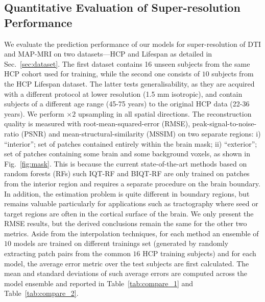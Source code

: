 \subsection{Quantitative Evaluation of Super-resolution Performance}
We evaluate the prediction performance of our models for super-resolution of DTI and MAP-MRI on two datasets---HCP and Lifespan as detailed in Sec.~\ref{sec:dataset}. The first dataset contains 16 unseen subjects from the same HCP cohort used for training, while the second one consists of $10$ subjects from the HCP Lifespan dataset. The latter tests generalisability, as they are acquired with a different protocol at lower resolution (1.5 mm isotropic), and contain subjects of a different age range (45-75 years) to the original HCP data (22-36 years). We perform $\times 2$ upsampling in all spatial directions. The reconstruction quality is measured with root-mean-squared-error (RMSE), peak-signal-to-noise-ratio (PSNR) and mean-structural-similarity (MSSIM) \cite{wang2004image} on two separate regions:  i) ``interior''; set of patches contained entirely within the brain mask; ii) ``exterior''; set of patches containing some brain and some background voxels, as shown in Fig.~\ref{fig:mask}. This is because the current state-of-the-art methods based on random forests (RFs) such IQT-RF \cite{alexander2017image} and BIQT-RF \cite{tanno2016bayesian} are only trained on patches from the interior region and requires a separate procedure on the brain boundary. In addition, the estimation problem is quite different in boundary regions, but remains valuable particularly for applications such as tractography where seed or target regions are often in the cortical surface of the brain. We only present the RMSE results, but the derived conclusions remain the same for the other two metrics. Aside from the interpolation techniques, for each method an ensemble of $10$ models are trained on different trainings set (generated by randomly extracting patch pairs from the common $16$ HCP training subjects) and for each model, the average error metric over the test subjects are first calculated. The mean and standard deviations of such average errors are computed across the model ensemble and reported in Table~\ref{tab:compare_1} and Table~\ref{tab:compare_2}. 

